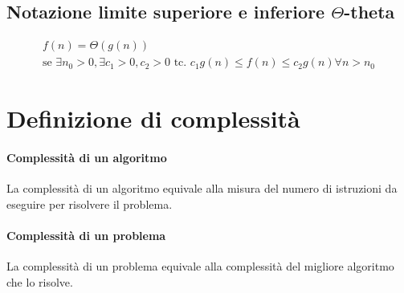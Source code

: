\subsection*{Notazione limite superiore e inferiore $\varTheta$-theta}
\begin{gather*}
f(n)=\varTheta(g(n))\\
\text{se } \exists n_0 >0, \exists c_1>0,c_2>0 \text{ tc. } c_1g(n)\leq f(n)\leq c_2 g(n) \forall n>n_0
\end{gather*}

\section{Definizione di complessità}

\paragraph{Complessità di un algoritmo} La complessità di un algoritmo equivale alla misura del numero di istruzioni da eseguire per risolvere il problema.

\paragraph{Complessità di un problema} La complessità di un problema equivale alla complessità del migliore algoritmo che lo risolve.